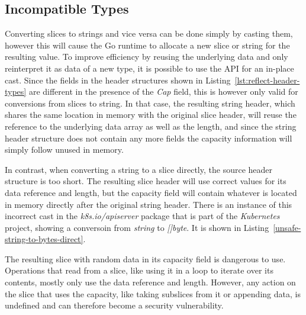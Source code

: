 
\subsection{Incompatible Types}\label{subsec:unsafe-security-problems:slice-casts:incompatible-types}

Converting slices to strings and vice versa can be done simply by casting them, however this will cause the Go runtime
to allocate a new slice or string for the resulting value.
To improve efficiency by reusing the underlying data and only reinterpret it as data of a new type, it is possible to
use the \unsafe{} \acrshort{API} for an in-place cast.
Since the fields in the header structures shown in Listing~\ref{lst:reflect-header-types} are different in the presence
of the \textit{Cap} field, this is however only valid for conversions from slices to string.
In that case, the resulting string header, which shares the same location in memory with the original slice header, will
reuse the reference to the underlying data array as well as the length, and since the string header structure does not
contain any more fields the capacity information will simply follow unused in memory.

In contrast, when converting a string to a slice directly, the source header structure is too short.
The resulting slice header will use correct values for its data reference and length, but the capacity field will
contain whatever is located in memory directly after the original string header.
There is an instance of this incorrect cast in the \textit{k8s.io/apiserver} package that is part of the
\textit{Kubernetes} project, showing a conversoin from \textit{string} to \textit{[]byte}.
It is shown in Listing~\ref{unsafe-string-to-bytes-direct}.



The resulting slice with random data in its capacity field is dangerous to use.
Operations that read from a slice, like using it in a loop to iterate over its contents, mostly only use the data
reference and length.
However, any action on the slice that uses the capacity, like taking subslices from it or appending data, is undefined
and can therefore become a security vulnerability.



